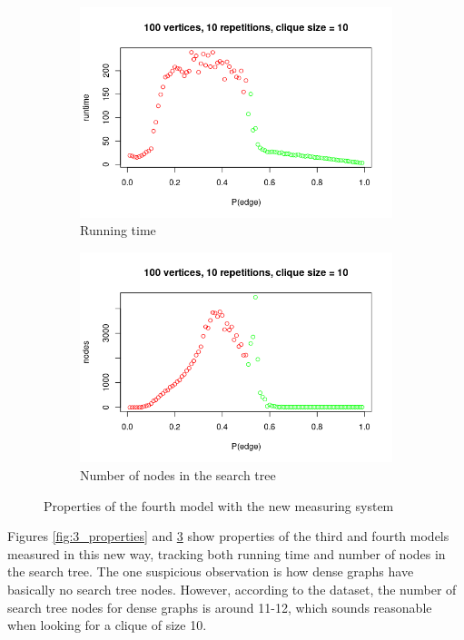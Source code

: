 \documentclass{article}
\begin{document}
\begin{figure}
  \begin{subfigure}{.5\textwidth}
    \includegraphics[scale=0.5]{4_runtime.png}
    \caption{Running time}
    \label{fig:4_runtime}
  \end{subfigure}
  \begin{subfigure}{.5\textwidth}
    \includegraphics[scale=0.5]{4_nodes.png}
    \caption{Number of nodes in the search tree}
    \label{fig:4_nodes}
  \end{subfigure}
  \caption{Properties of the fourth model with the new measuring system}
  \label{fig:4_properties}
\end{figure}
Figures \ref{fig:3_properties} and \ref{fig:4_properties} show properties of the third and fourth models measured in this new way, tracking both running time and number of nodes in the search tree. The one suspicious observation is how dense graphs have basically no search tree nodes. However, according to the dataset, the number of search tree nodes for dense graphs is around 11-12, which sounds reasonable when looking for a clique of size 10.
\end{document}
